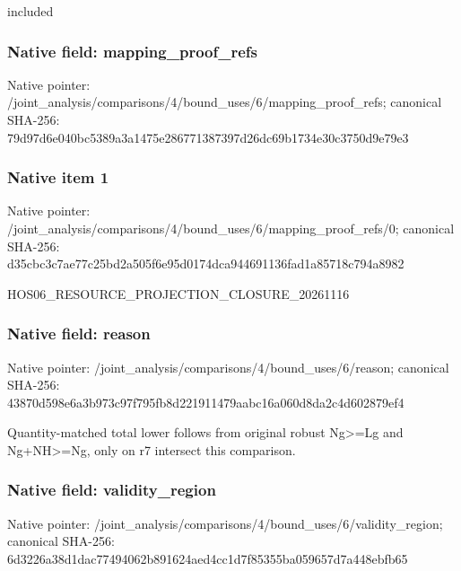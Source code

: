\documentclass[10pt,a4paper]{article}
\begin{document}
\begingroup\raggedright\sloppy included\par\endgroup

\subsubsection{Native field: mapping\_\allowbreak{}proof\_\allowbreak{}refs}
Native pointer: /joint\_\allowbreak{}analysis/comparisons/4/bound\_\allowbreak{}uses/6/mapping\_\allowbreak{}proof\_\allowbreak{}refs; canonical SHA-256: 79d97d6e040bc5389a3a1475e286771387397d26dc69b1734e30c3750d9e79e3

\subsubsection{Native item 1}
Native pointer: /joint\_\allowbreak{}analysis/comparisons/4/bound\_\allowbreak{}uses/6/mapping\_\allowbreak{}proof\_\allowbreak{}refs/0; canonical SHA-256: d35cbc3c7ae77c25bd2a505f6e95d0174dca944691136fad1a85718c794a8982

\begingroup\raggedright\sloppy HOS06\_\allowbreak{}RESOURCE\_\allowbreak{}PROJECTION\_\allowbreak{}CLOSURE\_\allowbreak{}20261116\par\endgroup

\subsubsection{Native field: reason}
Native pointer: /joint\_\allowbreak{}analysis/comparisons/4/bound\_\allowbreak{}uses/6/reason; canonical SHA-256: 43870d598e6a3b973c97f795fb8d221911479aabc16a060d8da2c4d602879ef4

\begingroup\raggedright\sloppy Quantity-matched total lower follows from original robust Ng>=\allowbreak{}Lg and Ng+NH>=\allowbreak{}Ng,\allowbreak{} only on r7 intersect this comparison.\par\endgroup

\subsubsection{Native field: validity\_\allowbreak{}region}
Native pointer: /joint\_\allowbreak{}analysis/comparisons/4/bound\_\allowbreak{}uses/6/validity\_\allowbreak{}region; canonical SHA-256: 6d3226a38d1dac77494062b891624aed4cc1d7f85355ba059657d7a448ebfb65
\end{document}
